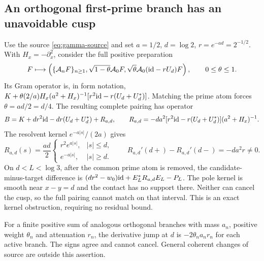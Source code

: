 \subsection{An orthogonal first-prime branch has an unavoidable cusp}
Use the source \eqref{eq:gamma-source} and set $a=1/2$,
$d=\log2$, $r=e^{-ad}=2^{-1/2}$. With $H_x=-\partial_x^2$,
consider the full positive preparation
\begin{equation}\label{eq:branch-source}
 F\longmapsto\left(
 \{\mathcal A_nF\}_{n\geq1},
 \sqrt{1-\theta}\mathcal A_0F,
 \sqrt\theta\mathcal A_0(\mathrm{id}-rU_d)F\right),
 \qquad 0\leq\theta\leq1.
\end{equation}
Its Gram operator is, in form notation,
$K+\theta(2/a)H_x(a^2+H_x)^{-1}
[r^2\mathrm{id}-r(U_d+U_d^*)]$.
Matching the prime atom forces $\theta=ad/2=d/4$. The resulting
complete pairing has operator
\begin{equation}\label{eq:branch-gram}
 B=K+dr^2\mathrm{id}-dr(U_d+U_d^*)+R_{a,d},
 \qquad
 R_{a,d}=-da^2[r^2\mathrm{id}-r(U_d+U_d^*)](a^2+H_x)^{-1}.
\end{equation}
The resolvent kernel $e^{-a|s|}/(2a)$ gives
\begin{equation}\label{eq:cusp-kernel}
 R_{a,d}(s)=\frac{ad}{2}
 \begin{cases}
 r^2e^{a|s|},&|s|\leq d,\\
 e^{-a|s|},&|s|\geq d.
 \end{cases}
 \qquad
 R_{a,d}'(d+)-R_{a,d}'(d-)=-da^2r\ne0.
\end{equation}
On $d<L<\log3$, after the common prime atom is removed,
the candidate-minus-target difference is
$(dr^2-w_0)\mathrm{id}+E_L^*R_{a,d}E_L-P_L$. The pole kernel is smooth
near $x-y=d$ and the contact has no support there. Neither can
cancel the cusp, so the full pairing cannot match on that interval.
This is an exact kernel obstruction, requiring no residual bound.

For a finite positive sum of analogous orthogonal branches with mass
$a_n$, positive weight $\theta_n$ and attenuation $r_n$, the derivative
jump at $d$ is $-2\theta_na_nr_n$ for each active branch. The signs
agree and cannot cancel. General coherent changes of source are
outside this assertion.

